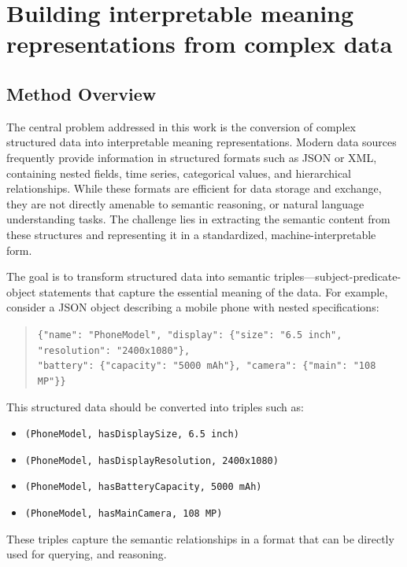 
\chapter{Building interpretable meaning representations from complex data}
\label{chap:meaning-representation}

\section{Method Overview}

The central problem addressed in this work is the conversion of complex structured data into interpretable meaning representations. Modern data sources frequently provide information in structured formats such as JSON or XML, containing nested fields, time series, categorical values, and hierarchical relationships. While these formats are efficient for data storage and exchange, they are not directly amenable to semantic reasoning, or natural language understanding tasks. The challenge lies in extracting the semantic content from these structures and representing it in a standardized, machine-interpretable form.

The goal is to transform structured data into semantic triples---subject-predicate-object statements that capture the essential meaning of the data. For example, consider a JSON object describing a mobile phone with nested specifications:

\begin{quote}
\small
\texttt{\{"name": "PhoneModel", "display": \{"size": "6.5 inch", "resolution": "2400x1080"\},} \\
\texttt{"battery": \{"capacity": "5000 mAh"\}, "camera": \{"main": "108 MP"\}\}}
\end{quote}

\noindent This structured data should be converted into triples such as:
\begin{itemize}
  \item \texttt{(PhoneModel, hasDisplaySize, 6.5 inch)}
  \item \texttt{(PhoneModel, hasDisplayResolution, 2400x1080)}
  \item \texttt{(PhoneModel, hasBatteryCapacity, 5000 mAh)}
  \item \texttt{(PhoneModel, hasMainCamera, 108 MP)}
\end{itemize}

\noindent These triples capture the semantic relationships in a format that can be directly used for querying, and reasoning.

